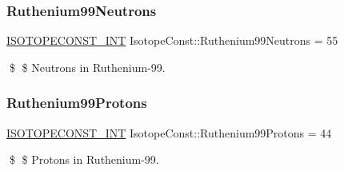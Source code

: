\subsubsection{\texorpdfstring{Ruthenium99\+Neutrons}{Ruthenium99Neutrons}}
{\footnotesize\ttfamily \mbox{\hyperlink{group___isotope_const-_macros_ga5f18360b3e99483a35c32d789e62621c}{I\+S\+O\+T\+O\+P\+E\+C\+O\+N\+S\+T\+\_\+\+I\+NT}} Isotope\+Const\+::\+Ruthenium99\+Neutrons = 55}

\$ \$ Neutrons in Ruthenium-\/99. \mbox{\label{group___isotope_const-_ruthenium-_ru99_ga3524fa4fc739be2767a41ec1ba873f97}} 
\subsubsection{\texorpdfstring{Ruthenium99\+Protons}{Ruthenium99Protons}}
{\footnotesize\ttfamily \mbox{\hyperlink{group___isotope_const-_macros_ga5f18360b3e99483a35c32d789e62621c}{I\+S\+O\+T\+O\+P\+E\+C\+O\+N\+S\+T\+\_\+\+I\+NT}} Isotope\+Const\+::\+Ruthenium99\+Protons = 44}

\$ \$ Protons in Ruthenium-\/99. 